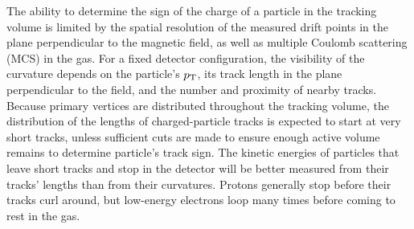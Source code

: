 %
The ability to determine the sign of the charge of a particle in the  tracking volume is limited by the spatial resolution of the measured drift points in the plane perpendicular to the magnetic field, as well as multiple Coulomb scattering (MCS) in the gas. For a fixed detector configuration, the visibility of the curvature depends on the particle's $p_{\rm{T}}$, its track length in the plane perpendicular to the field, and the number and proximity of nearby tracks.  Because primary vertices are distributed throughout the tracking volume, the distribution of the lengths of charged-particle tracks is expected to start at very short tracks, unless sufficient  cuts are made to ensure enough active volume remains to determine particle's track sign.  The kinetic energies of particles that leave short tracks and stop in the detector will be better measured from their tracks' lengths than from their curvatures.  Protons generally stop before their tracks curl around, but low-energy electrons loop many times before coming to rest in the gas.

